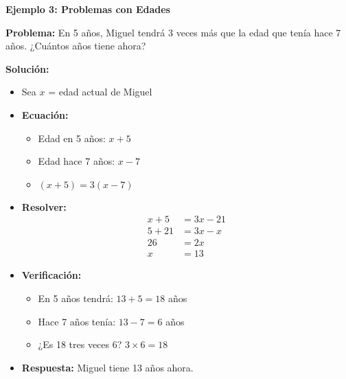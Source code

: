 \begin{example}
\textbf{Ejemplo 3: Problemas con Edades}

\textbf{Problema:} En 5 años, Miguel tendrá 3 veces más que la edad que tenía hace 7 años. ¿Cuántos años tiene ahora?

\textbf{Solución:}
\begin{itemize}
    \item Sea $x$ = edad actual de Miguel
    \item \textbf{Ecuación:}
    \begin{itemize}
        \item Edad en 5 años: $x + 5$
        \item Edad hace 7 años: $x - 7$
        \item $(x + 5) = 3(x - 7)$
    \end{itemize}
    \item \textbf{Resolver:}
    \begin{align*}
    x + 5 &= 3x - 21 \\
    5 + 21 &= 3x - x \\
    26 &= 2x \\
    x &= 13
    \end{align*}
    \item \textbf{Verificación:}
    \begin{itemize}
        \item En 5 años tendrá: $13 + 5 = 18$ años
        \item Hace 7 años tenía: $13 - 7 = 6$ años
        \item ¿Es 18 tres veces 6? $3 \times 6 = 18$ \checkmark
    \end{itemize}
    \item \textbf{Respuesta:} Miguel tiene 13 años ahora.
\end{itemize}
\end{example}

